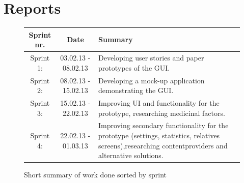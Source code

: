 \section{Reports}

\begin{figure}
\caption{Short summary of work done sorted by sprint}
\begin{tabular}{|c|c|p{7cm}|}
\hline
Sprint nr. & Date & Summary\\
\hline
Sprint 1: & 03.02.13 - 08.02.13 & Developing user stories and paper prototypes of the GUI.\\ 
\hline
Sprint 2: & 08.02.13 - 15.02.13 & Developing a mock-up application demonstrating the GUI.\\
\hline
Sprint 3: & 15.02.13 - 22.02.13 & Improving UI and functionality for the prototype, researching medicinal factors. \\
\hline
Sprint 4: & 22.02.13 - 01.03.13 & Improving secondary functionality for the prototype (settings, statistics, relatives screens),researching contentproviders and alternative solutions. \\
\hline

\end{tabular} 
\label{tab:sprintList}

\end{figure}